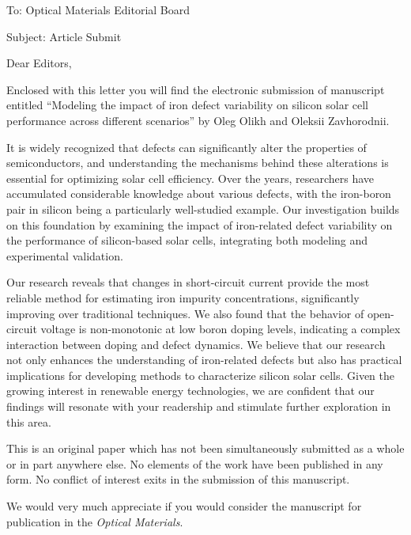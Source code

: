 \documentclass[preprint]{elsarticle}
\begin{document}
To:
Optical Materials Editorial Board


Subject:
Article Submit

\vspace{5mm}
Dear Editors,

\vspace{3mm}
Enclosed with this letter you will find the electronic submission of manuscript entitled
``Modeling the impact of iron defect variability on silicon solar cell performance across different scenarios''
by Oleg Olikh and Oleksii Zavhorodnii.

It is widely recognized that defects can significantly alter the properties of semiconductors,
and understanding the mechanisms behind these alterations is essential for optimizing solar cell efficiency.
Over the years, researchers have accumulated considerable knowledge about various defects,
with the iron-boron pair in silicon being a particularly well-studied example.
Our investigation builds on this foundation by examining the impact of iron-related defect variability
on the performance of silicon-based solar cells, integrating both modeling and experimental validation.

Our research reveals that changes in short-circuit current provide the most reliable method for estimating iron impurity concentrations,
significantly improving over traditional techniques.
We also found that the behavior of open-circuit voltage is non-monotonic at low boron doping levels,
indicating a complex interaction between doping and defect dynamics.
We believe that our research not only enhances the understanding of iron-related defects
but also has practical implications for developing methods to characterize silicon solar cells.
Given the growing interest in renewable energy technologies,
we are confident that our findings will resonate with your readership and stimulate further exploration in this area.


This is an original paper which has not been simultaneously submitted as a whole or in part anywhere else.
No elements of the work have been published in any form.
No conflict of interest exits in the submission of this manuscript.


We would  very much appreciate if you would consider the manuscript for publication in the \emph{Optical Materials}.
\end{document}
